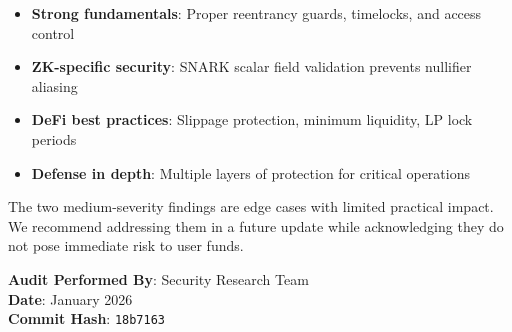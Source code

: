 \documentclass[12pt,a4paper]{article}
\begin{document}
\begin{itemize}
    \item \textbf{Strong fundamentals}: Proper reentrancy guards, timelocks, and access control
    \item \textbf{ZK-specific security}: SNARK scalar field validation prevents nullifier aliasing
    \item \textbf{DeFi best practices}: Slippage protection, minimum liquidity, LP lock periods
    \item \textbf{Defense in depth}: Multiple layers of protection for critical operations
\end{itemize}

The two medium-severity findings are edge cases with limited practical impact. We recommend addressing them in a future update while acknowledging they do not pose immediate risk to user funds.

\vspace{1cm}
\noindent\textbf{Audit Performed By}: Security Research Team\\
\textbf{Date}: January 2026\\
\textbf{Commit Hash}: \texttt{18b7163}
\end{document}
